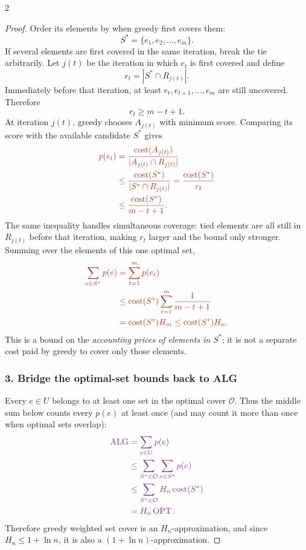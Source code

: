 \documentclass[10pt]{article}
\theoremstyle{definition}
\newcommand{\OPT}{\operatorname{OPT}}
\newcommand{\ALG}{\operatorname{ALG}}
\begin{document}
\begin{multicols*}{2}
\begin{proof}
Order its elements by when greedy first covers them:
\[
  S^*=\{e_1,e_2,\ldots,e_m\}.
\]
If several elements are first covered in the same iteration, break the tie
arbitrarily. Let $j(t)$ be the iteration in which $e_t$ is first covered and
define
\[
  r_t=|S^*\cap R_{j(t)}|.
\]
Immediately before that iteration, at least
$e_t,e_{t+1},\ldots,e_m$ are still uncovered. Therefore
\[
  r_t\geq m-t+1.
\]
At iteration $j(t)$, greedy chooses $A_{j(t)}$ with minimum score. Comparing
its score with the available candidate $S^*$ gives
\[
  \color{optred}
  \begin{aligned}
  p(e_t)
  &=\frac{\operatorname{cost}(A_{j(t)})}
          {|A_{j(t)}\cap R_{j(t)}|}\\
  &\leq\frac{\operatorname{cost}(S^*)}{|S^*\cap R_{j(t)}|}
   =\frac{\operatorname{cost}(S^*)}{r_t}\\
  &\leq\frac{\operatorname{cost}(S^*)}{m-t+1}.
  \end{aligned}
\]
The same inequality handles simultaneous coverage: tied elements are all
still in $R_{j(t)}$ before that iteration, making $r_t$ larger and the bound
only stronger. Summing over the elements of this one optimal set,
\[
  \color{optred}
  \begin{aligned}
  \sum_{e\in S^*}p(e)
  &=\sum_{t=1}^{m}p(e_t)\\
  &\leq\operatorname{cost}(S^*)
    \sum_{t=1}^{m}\frac1{m-t+1}\\
  &=\operatorname{cost}(S^*)H_m
   \leq\operatorname{cost}(S^*)H_n.
  \end{aligned}
\]
This is a bound on the \emph{accounting prices of elements in $S^*$}; it is
not a separate cost paid by greedy to cover only those elements.

\subsubsection*{\textcolor{bridgepurple}{3. Bridge the optimal-set bounds back to ALG}}

Every $e\in U$ belongs to at least one set in the optimal cover $\mathcal O$.
Thus the middle sum below counts every $p(e)$ at least once (and may count it
more than once when optimal sets overlap):
\[
  \color{bridgepurple}
  \begin{aligned}
  \ALG
  &=\sum_{e\in U}p(e)\\
  &\leq\sum_{S^*\in\mathcal O}\sum_{e\in S^*}p(e)\\
  &\leq\sum_{S^*\in\mathcal O}
      H_n\operatorname{cost}(S^*)\\
  &=H_n\OPT.
  \end{aligned}
\]
Therefore greedy weighted set cover is an $H_n$-approximation, and since
$H_n\leq1+\ln n$, it is also a $(1+\ln n)$-approximation.
\end{proof}




\end{multicols*}
\end{document}

